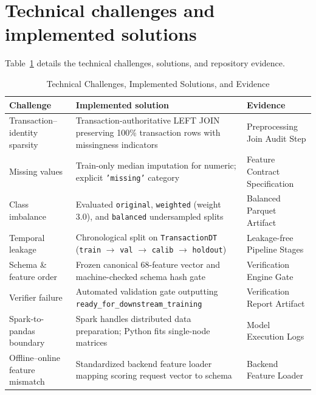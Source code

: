 

\section{Technical challenges and implemented solutions}

Table~\ref{tab:challenges-solutions} details the technical challenges, solutions, and repository evidence.

\begin{table}[H]
\centering
\small
{}
\caption{Technical Challenges, Implemented Solutions, and Evidence}
\label{tab:challenges-solutions}
\begin{tabularx}{\textwidth}{>{\raggedright\arraybackslash}p{} X >{\raggedright\arraybackslash}p{}}
\toprule
\textbf{Challenge} & \textbf{Implemented solution} & \textbf{Evidence}\\
\midrule
Transaction--identity sparsity & Transaction-authoritative LEFT JOIN preserving 100\% transaction rows with missingness indicators & Preprocessing Join Audit Step\\
Missing values & Train-only median imputation for numeric; explicit \texttt{'missing'} category & Feature Contract Specification\\
Class imbalance & Evaluated \texttt{original}, \texttt{weighted} (weight 3.0), and \texttt{balanced} undersampled splits & Balanced Parquet Artifact\\
Temporal leakage & Chronological split on \texttt{TransactionDT} (\texttt{train} $\rightarrow$ \texttt{val} $\rightarrow$ \texttt{calib} $\rightarrow$ \texttt{holdout}) & Leakage-free Pipeline Stages\\
Schema \& feature order & Frozen canonical 68-feature vector and machine-checked schema hash gate & Verification Engine Gate\\
Verifier failure & Automated validation gate outputting \texttt{ready\_for\_downstream\_training} & Verification Report Artifact\\
Spark-to-pandas boundary & Spark handles distributed data preparation; Python fits single-node matrices & Model Execution Logs\\
Offline--online feature mismatch & Standardized backend feature loader mapping scoring request vector to schema & Backend Feature Loader\\
\bottomrule
\end{tabularx}
\end{table}

